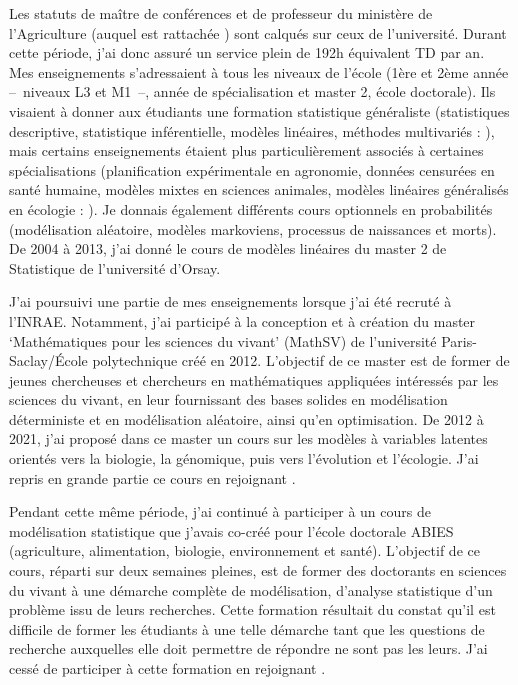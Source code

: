 Les statuts de maître de conférences et de professeur du ministère de l’Agriculture (auquel est rattachée \APT) sont calqués sur ceux de l’université. Durant cette période, j'ai donc assuré un service plein de 192h équivalent TD par an. Mes enseignements s’adressaient à tous les niveaux de l’école (1ère et 2ème année --~niveaux L3 et M1~--, année de spécialisation et master 2, école doctorale). Ils visaient à donner aux étudiants une formation statistique généraliste (statistiques descriptive, statistique inférentielle, modèles linéaires, méthodes multivariés : \cite{DRV99}), mais certains enseignements étaient plus particulièrement associés à certaines spécialisations (planification expérimentale en agronomie, données censurées en santé humaine, modèles mixtes en sciences animales, modèles linéaires généralisés en écologie : \cite{DBE15}). Je donnais également différents cours optionnels en probabilités (modélisation aléatoire, modèles markoviens, processus de naissances et morts). De 2004 à 2013, j'ai donné le cours de modèles linéaires du master 2 de Statistique de l'université d'Orsay.

\bigskip
J’ai poursuivi une partie de mes enseignements lorsque j’ai été recruté à l’INRAE. Notamment, j'ai participé à la conception et à création du master ‘Mathématiques pour les sciences du vivant’ (MathSV) de l’université Paris-Saclay/École polytechnique créé en 2012. L’objectif de ce master est de former de jeunes chercheuses et chercheurs en mathématiques appliquées intéressés par les sciences du vivant, en leur fournissant des bases solides en modélisation déterministe et en modélisation aléatoire, ainsi qu'en optimisation. De 2012 à 2021, j’ai proposé dans ce master un cours sur les modèles à variables latentes orientés vers la biologie, la génomique, puis vers l’évolution et l’écologie. J’ai repris en grande partie ce cours en rejoignant \SU.

Pendant cette même période, j’ai continué à participer à un cours de modélisation statistique que j’avais co-créé pour l’école doctorale ABIES (agriculture, alimentation, biologie, environnement et santé). L’objectif de ce cours, réparti sur deux semaines pleines, est de former des doctorants en sciences du vivant à une démarche complète de modélisation, d'analyse statistique d’un problème issu de leurs recherches. Cette formation résultait du constat qu’il est difficile de former les étudiants à une telle démarche tant que les questions de recherche auxquelles elle doit permettre de répondre ne sont pas les leurs. J'ai cessé de participer à cette formation en rejoignant \SU.

